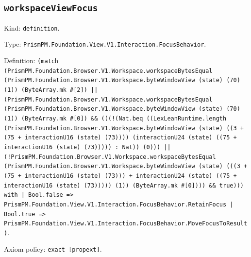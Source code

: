 \documentclass[11pt]{article}
\begin{document}
\subsection*{\texttt{workspaceViewFocus}}
\noindent Kind: \texttt{definition}.\par
\noindent Type: \texttt{PrismPM.Foundation.View.V1.Interaction.FocusBehavior}.\par
\noindent Definition: \texttt{(match (PrismPM.Foundation.Browser.V1.Workspace.workspaceBytesEqual (PrismPM.Foundation.Browser.V1.Workspace.byteWindowView (state) (70) (1)) (ByteArray.mk \#[2]) || (PrismPM.Foundation.Browser.V1.Workspace.workspaceBytesEqual (PrismPM.Foundation.Browser.V1.Workspace.byteWindowView (state) (70) (1)) (ByteArray.mk \#[0]) \&\& (((!(Nat.beq ((LexLeanRuntime.length (PrismPM.Foundation.Browser.V1.Workspace.byteWindowView (state) ((3 + (75 + interactionU16 (state) (73)))) (interactionU24 (state) ((75 + interactionU16 (state) (73))))) : Nat)) (0))) || (!PrismPM.Foundation.Browser.V1.Workspace.workspaceBytesEqual (PrismPM.Foundation.Browser.V1.Workspace.byteWindowView (state) (((3 + (75 + interactionU16 (state) (73))) + interactionU24 (state) ((75 + interactionU16 (state) (73))))) (1)) (ByteArray.mk \#[0]))) \&\& true))) with | Bool.false => PrismPM.Foundation.View.V1.Interaction.FocusBehavior.RetainFocus | Bool.true => PrismPM.Foundation.View.V1.Interaction.FocusBehavior.MoveFocusToResult)}.\par
\noindent Axiom policy: \texttt{exact [propext]}.\par
\end{document}
